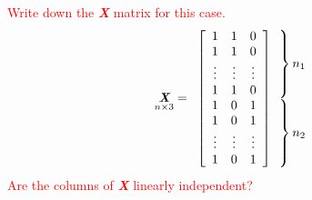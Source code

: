 \documentclass[12pt]{report}
\begin{document}
\noindent \textcolor{red}
{
	Write down the \textit{\textbf{X}} matrix for this case.
}
\begin{equation*}
\underset{n\times3}{\textit{\textbf{X}}} = \begin{array}{c@{\!\!\!}l}
\left[ \begin{array}[c]{ccccc}
1 & 1 & 0 \\
1 & 1 & 0 \\
\vdots & \vdots & \vdots \\
1 & 1 & 0 \\
1 & 0 & 1 \\
1 & 0 & 1 \\
\vdots & \vdots & \vdots \\
1 & 0 & 1 \\
\end{array}  \right]
&
\begin{array}[c]{@{}l@{\,}l}
\left. \begin{array}{c} \vphantom{0} \\ \vphantom{0} \\\vphantom{\vdots}\\ \vphantom{0} \end{array} \right\} & \text{$n_1$} \\
\left. \begin{array}{c} \vphantom{1} \\ \vphantom{1} \\ \vphantom{\vdots}
\\ \vphantom{1}  \end{array} \right\} & \text{$n_2$} \\
\end{array}
\end{array}
\end{equation*}
\noindent \textcolor{red}
{
	Are the columns of \textit{\textbf{X}} linearly independent?
}
\end{document}
